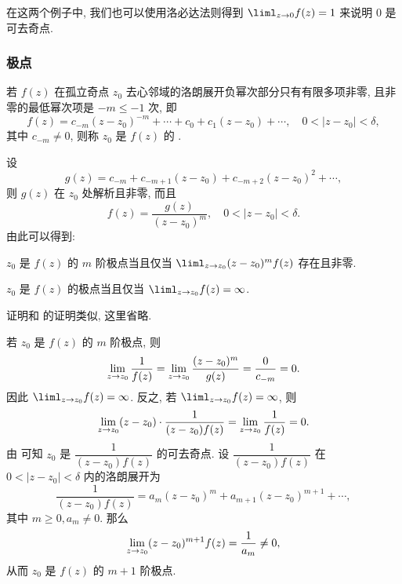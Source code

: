 在这两个例子中, 我们也可以使用洛必达法则得到 $\liml_{z\ra 0}f(z)=1$ 来说明 $0$ 是可去奇点.


\subsubsection{极点}

\begin{definition}
  若 $f(z)$ 在孤立奇点 $z_0$ 去心邻域的洛朗展开负幂次部分只有有限多项非零, 且非零的最低幂次项是 $-m\le-1$ 次, 即
  \[
    f(z)=c_{-m}(z-z_0)^{-m}+\cdots+c_0+c_1(z-z_0)+\cdots,\quad  0<|z-z_0|<\delta,
  \]
  其中 $c_{-m}\neq 0$, 则称 $z_0$ 是 $f(z)$ 的 .\footnotemark
\end{definition}

设
\[
  g(z)=c_{-m}+c_{-m+1}(z-z_0)+c_{-m+2}(z-z_0)^2+\cdots,
\]
则 $g(z)$ 在 $z_0$ 处解析且非零, 而且
\[
  f(z)=\dfrac{g(z)}{(z-z_0)^m},\quad 0<|z-z_0|<\delta.
\]
由此可以得到:

\begin{theorem}
  \label{thm:test-pole}
  \begin{enuma}
    \item $z_0$ 是 $f(z)$ 的 $m$ 阶极点当且仅当 $\liml_{z\ra z_0}(z-z_0)^mf(z)$ 存在且非零.
    \item $z_0$ 是 $f(z)$ 的极点当且仅当 $\liml_{z\ra z_0}f(z)=\infty$.
  \end{enuma}
\end{theorem}

\begin{proofenuma}
  \item 证明和 的证明类似, 这里省略.
  \item 若 $z_0$ 是 $f(z)$ 的 $m$ 阶极点, 则
  \[
      \lim_{z\rightarrow z_0}\frac1{f(z)}
    =\lim_{z\rightarrow z_0}\frac{(z-z_0)^m}{g(z)}
    =\frac{0}{c_{-m}}=0.
  \]
  因此 $\liml_{z\ra z_0}f(z)=\infty$.
  反之, 若 $\liml_{z\ra z_0}f(z)=\infty$, 则
  \[
      \lim_{z\rightarrow z_0}(z-z_0)\cdot\frac1{(z-z_0)f(z)}
    =\lim_{z\rightarrow z_0}\frac1{f(z)}=0.
  \]
  由 可知 $z_0$ 是 $\dfrac 1{(z-z_0)f(z)}$ 的可去奇点.
  设 $\dfrac 1{(z-z_0)f(z)}$ 在 $0<|z-z_0|<\delta$ 内的洛朗展开为
  \[
    \frac1{(z-z_0)f(z)}=a_m(z-z_0)^m+a_{m+1}(z-z_0)^{m+1}+\cdots,
  \]
  其中 $m\ge0,a_m\neq 0$.
  那么
  \[
    \lim_{z\rightarrow z_0}(z-z_0)^{m+1} f(z)=\frac1{a_m}\neq 0,
  \]
  从而 $z_0$ 是 $f(z)$ 的 $m+1$ 阶极点.\qedhere
\end{proofenuma}

